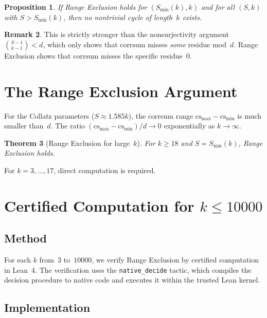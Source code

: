 \documentclass[11pt,a4paper]{article}
\theoremstyle{plain}
\newtheorem{theorem}{Theorem}[section]
\newtheorem{proposition}[theorem]{Proposition}
\theoremstyle{definition}
\newtheorem{remark}[theorem]{Remark}
\newcommand{\corr}{\mathrm{corrsum}}
\begin{document}
\begin{proposition}\label{prop:RE-implies}
If Range Exclusion holds for $(S_{\min}(k), k)$ and for all $(S, k)$ with $S > S_{\min}(k)$, then no nontrivial cycle of length~$k$ exists.
\end{proposition}

\begin{remark}
This is strictly stronger than the nonsurjectivity argument $\binom{S-1}{k-1} < d$, which only shows that $\corr$ misses \emph{some} residue mod~$d$. Range Exclusion shows that $\corr$ misses the specific residue~$0$.
\end{remark}

\section{The Range Exclusion Argument}

For the Collatz parameters ($S \approx 1.585k$), the corrsum range $\mathrm{cs_{max}} - \mathrm{cs_{min}}$ is much smaller than~$d$. The ratio $(\mathrm{cs_{max}} - \mathrm{cs_{min}})/d \to 0$ exponentially as $k \to \infty$.

\begin{theorem}[Range Exclusion for large~$k$]\label{thm:RE-large}
For $k \geq 18$ and $S = S_{\min}(k)$, Range Exclusion holds.
\end{theorem}

For $k = 3, \ldots, 17$, direct computation is required.

\section{Certified Computation for $k \leq 10000$}

\subsection{Method}

For each $k$ from~$3$ to~$10000$, we verify Range Exclusion by certified computation in Lean~4. The verification uses the \texttt{native\_decide} tactic, which compiles the decision procedure to native code and executes it within the trusted Lean kernel.

\subsection{Implementation}
\end{document}
